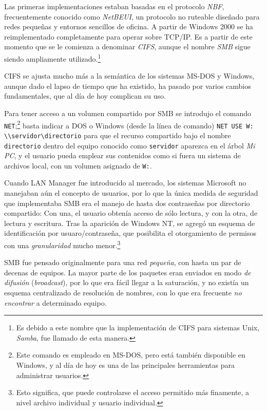 \documentclass[11pt,fleqn]{book} %
\begin{document}
Las primeras implementaciones estaban basadas en el protocolo \emph{NBF},
frecuentemente conocido como \emph{NetBEUI}, un protocolo no ruteable
diseñado para redes pequeñas y entornos sencillos de oficina. A partir
de Windows 2000 se ha reimplementado completamente para operar sobre
TCP/IP. Es a partir de este momento que se le comienza a denominar
\emph{CIFS}, aunque el nombre \emph{SMB} sigue siendo ampliamente
utilizado.\footnote{Es debido a este nombre que la implementación de CIFS
para sistemas Unix, \emph{Samba}, fue llamado de esta manera. }

CIFS se ajusta mucho más a la semántica de los sistemas MS-DOS y
Windows, aunque dado el lapso de tiempo que ha existido, ha pasado por
varios cambios fundamentales, que al día de hoy complican su uso.

Para tener acceso a un volumen compartido por SMB se introdujo el
comando \texttt{NET};\footnote{Este comando es empleado en MS-DOS, pero está
también disponible en Windows, y al día de hoy es una de las
principales herramientas para administrar usuarios. } basta indicar a
DOS o Windows (desde la línea de comando) \texttt{NET USE W: \textbackslash{}\textbackslash{}servidor\textbackslash{}directorio} para que el recurso
compartido bajo el nombre \texttt{directorio} dentro del equipo conocido como
\texttt{servidor} aparezca en el árbol \emph{Mi PC}, y el usuario pueda emplear
sus contenidos como si fuera un sistema de archivos local, con un
volumen asignado de \texttt{W:}.

Cuando LAN Manager fue introducido al mercado, los sistemas Microsoft no manejaban
aún el concepto de usuarios, por lo que la única medida de seguridad
que implementaba SMB era el manejo de hasta dos contraseñas por
directorio compartido: Con una, el usuario obtenía acceso de sólo
lectura, y con la otra, de lectura y escritura. Tras la aparición de
Windows NT, se agregó un esquema de identificación por
usuaro/contraseña, que posibilita el otorgamiento de permisos con una
\emph{granularidad} mucho menor.\footnote{Esto significa, que puede
controlarse el acceso permitido más finamente, a nivel archivo
individual y usuario individual. }

SMB fue pensado originalmente para una red \emph{pequeña}, con hasta un par
de decenas de equipos. La mayor parte de los paquetes eran enviados en
modo \emph{de difusión} (\emph{broadcast}), por lo que era fácil llegar a la
saturación, y no existía un esquema centralizado de resolución de
nombres, con lo que era frecuente \emph{no encontrar} a determinado
equipo.
\end{document}
